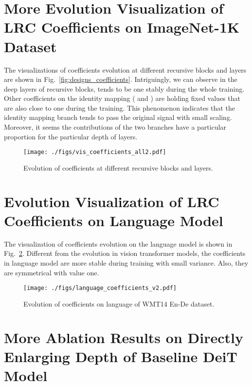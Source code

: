 \documentclass[runningheads]{llncs}
\begin{document}
	\vspace{-0.06in}
	\section{More Evolution Visualization of LRC Coefficients on ImageNet-1K Dataset} \label{more_LRC_SReT}
	The visualizations of coefficients evolution at different recursive blocks and layers are shown in Fig.~\ref{fig:designs_coefficients}. Intriguingly, we can observe in the deep layers of recursive blocks,  tends to be one stably during the whole training. Other coefficients on the identity mapping ( and ) are holding fixed values that are also close to one during the training. This phenomenon indicates that the identity mapping branch tends to pass the original signal with small scaling. Moreover, it seems the contributions of the two branches have a particular proportion for the particular depth of layers.
	
	
	\begin{figure}[h]
		\centering
		\texttt{[image: ./figs/vis\_coefficients\_all2.pdf]}
		\caption{Evolution of coefficients at different recursive blocks and layers.}
		\label{fig:more_vis_coefficients}
	\end{figure}
	
	\section{Evolution Visualization of LRC Coefficients on Language Model} \label{vis_language}
	
	The visualization of coefficients evolution on the language model is shown in Fig.~\ref{fig:mix_coefficients_language}. Different from the evolution in vision transformer models, the coefficients in language model are more stable during training with small variance. Also, they are symmetrical with value one.
	
	\begin{figure}[h]
		\centering
		\texttt{[image: ./figs/language\_coefficients\_v2.pdf]}
		\caption{Evolution of coefficients on language of WMT14 En-De dataset.}
		\label{fig:mix_coefficients_language}\vspace{-0.2in}
	\end{figure}
	
	
	\section{More Ablation Results on Directly Enlarging Depth of Baseline DeiT Model} \label{more_ablation_extend}
	
\end{document}
